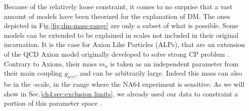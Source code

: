 Because of the relatively loose constraint, it comes to no surprise that a vast amount of models have been theorized for the explanation of DM. The ones depicted in Fig.\ref{fig:dm-mass-range} are only a subset of what is possible. Some models can be extended to be explained in scales not included in their original incarnation. It is the case for Axion Like Particles (ALPs), that are an extension of the QCD Axion model originally developed to solve strong CP problem \cite{PhysRevD.16.1791}. Contrary to Axions, their mass $m_a$ is taken as an independent parameter from their main coupling $g_{a \gamma \gamma}$, and can be arbitrarily large. Indeed this mass can also be in the \mev-\gev scale, in the range where the NA64 experiment is sensitive. As we will show in Sec.\ref{ch4:sec:exclusion limits}, we already used our data to constraint a portion of this parameter space \cite{Banerjee:2020fue}.

